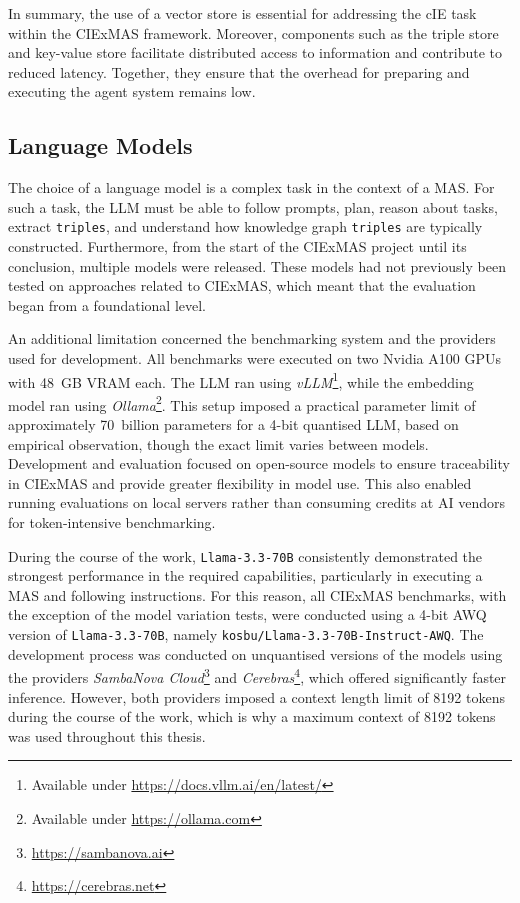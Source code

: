 \documentclass[a4paper,oneside,bibliography=totoc]{scrbook}
\begin{document}
In summary, the use of a vector store is essential for addressing the \ac{cIE} task within the CIExMAS framework. Moreover, components such as the triple store and key-value store facilitate distributed access to information and contribute to reduced latency. Together, they ensure that the overhead for preparing and executing the agent system remains low.

\subsection{Language Models}
\label{subsec:eval_language_models}

The choice of a language model is a complex task in the context of a \ac{MAS}. For such a task, the \ac{LLM} must be able to follow prompts, plan, reason about tasks, extract \texttt{triples}, and understand how knowledge graph \texttt{triples} are typically constructed. Furthermore, from the start of the CIExMAS project until its conclusion, multiple models were released. These models had not previously been tested on approaches related to CIExMAS, which meant that the evaluation began from a foundational level.

An additional limitation concerned the benchmarking system and the providers used for development. All benchmarks were executed on two Nvidia A100 GPUs with 48~GB VRAM each. The \ac{LLM} ran using \textit{vLLM}\footnote{Available under \url{https://docs.vllm.ai/en/latest/}}, while the embedding model ran using \textit{Ollama}\footnote{Available under \url{https://ollama.com}}. This setup imposed a practical parameter limit of approximately 70~billion parameters for a 4-bit quantised \ac{LLM}, based on empirical observation, though the exact limit varies between models. Development and evaluation focused on open-source models to ensure traceability in CIExMAS and provide greater flexibility in model use. This also enabled running evaluations on local servers rather than consuming credits at AI vendors for token-intensive benchmarking.

During the course of the work, \texttt{Llama-3.3-70B} consistently demonstrated the strongest performance in the required capabilities, particularly in executing a \ac{MAS} and following instructions. For this reason, all CIExMAS benchmarks, with the exception of the model variation tests, were conducted using a 4-bit AWQ version of \texttt{Llama-3.3-70B}, namely \texttt{kosbu/Llama-3.3-70B-Instruct-AWQ}. The development process was conducted on unquantised versions of the models using the providers \textit{SambaNova Cloud}\footnote{\url{https://sambanova.ai}} and \textit{Cerebras}\footnote{\url{https://cerebras.net}}, which offered significantly faster inference. However, both providers imposed a context length limit of 8192 tokens during the course of the work, which is why a maximum context of 8192 tokens was used throughout this thesis.
\end{document}

